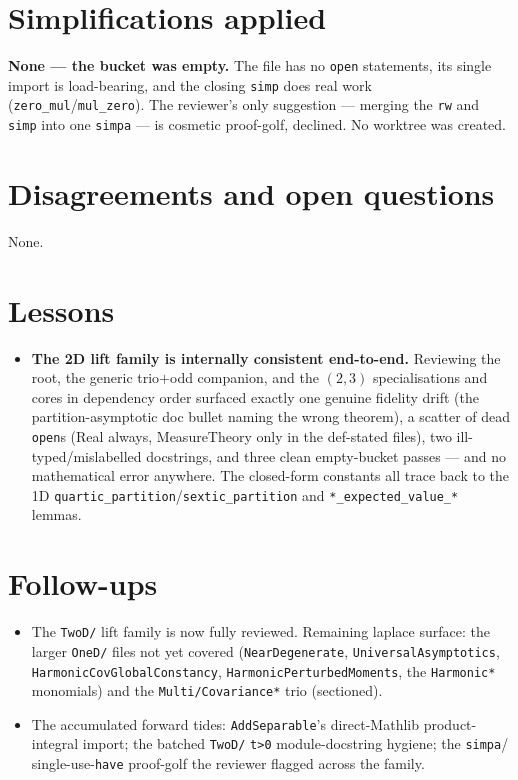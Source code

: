 \documentclass[11pt]{article}
\begin{document}
\section{Simplifications applied}
\textbf{None --- the bucket was empty.} The file has no \texttt{open} statements, its single import
is load-bearing, and the closing \texttt{simp} does real work (\texttt{zero\_mul}/\texttt{mul\_zero}).
The reviewer's only suggestion --- merging the \texttt{rw} and \texttt{simp} into one \texttt{simpa}
--- is cosmetic proof-golf, declined. No worktree was created.

\section{Disagreements and open questions}
None.

\section{Lessons}
\begin{itemize}[noitemsep]
  \item \textbf{The 2D lift family is internally consistent end-to-end.} Reviewing the root, the
    generic trio$+$odd companion, and the $(2,3)$ specialisations and cores in dependency order
    surfaced exactly one genuine fidelity drift (the partition-asymptotic doc bullet naming the
    wrong theorem), a scatter of dead \texttt{open}s (Real always, MeasureTheory only in the
    def-stated files), two ill-typed/mislabelled docstrings, and three clean empty-bucket passes ---
    and no mathematical error anywhere. The closed-form constants all trace back to the 1D
    \texttt{quartic\_partition}/\texttt{sextic\_partition} and \texttt{*\_expected\_value\_*} lemmas.
\end{itemize}

\section{Follow-ups}
\begin{itemize}[noitemsep]
  \item The \texttt{TwoD/} lift family is now fully reviewed. Remaining laplace surface: the larger
    \texttt{OneD/} files not yet covered (\texttt{NearDegenerate}, \texttt{UniversalAsymptotics},
    \texttt{HarmonicCovGlobalConstancy}, \texttt{HarmonicPerturbedMoments}, the \texttt{Harmonic*}
    monomials) and the \texttt{Multi/Covariance*} trio (sectioned).
  \item The accumulated forward tides: \texttt{AddSeparable}'s direct-Mathlib product-integral
    import; the batched \texttt{TwoD/} \texttt{t>0} module-docstring hygiene; the \texttt{simpa}/%
    single-use-\texttt{have} proof-golf the reviewer flagged across the family.
\end{itemize}
\end{document}
